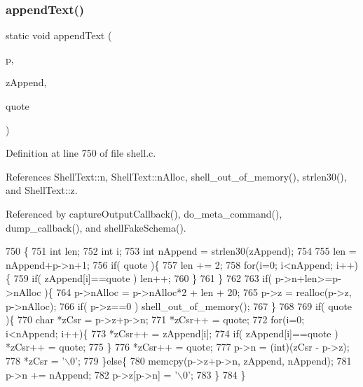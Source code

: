 \subsubsection{append\+Text()}
{\footnotesize\ttfamily static void append\+Text (\begin{DoxyParamCaption}\item[{\textbf{ Shell\+Text} $\ast$}]{p,  }\item[{char const $\ast$}]{z\+Append,  }\item[{char}]{quote }\end{DoxyParamCaption})\hspace{0.3cm}{\ttfamily [static]}}



Definition at line 750 of file shell.\+c.



References Shell\+Text\+::n, Shell\+Text\+::n\+Alloc, shell\+\_\+out\+\_\+of\+\_\+memory(), strlen30(), and Shell\+Text\+::z.



Referenced by capture\+Output\+Callback(), do\+\_\+meta\+\_\+command(), dump\+\_\+callback(), and shell\+Fake\+Schema().


\begin{DoxyCode}
750                                                                      \{
751   \textcolor{keywordtype}{int} len;
752   \textcolor{keywordtype}{int} i;
753   \textcolor{keywordtype}{int} nAppend = strlen30(zAppend);
754 
755   len = nAppend+p->n+1;
756   \textcolor{keywordflow}{if}( quote )\{
757     len += 2;
758     \textcolor{keywordflow}{for}(i=0; i<nAppend; i++)\{
759       \textcolor{keywordflow}{if}( zAppend[i]==quote ) len++;
760     \}
761   \}
762 
763   \textcolor{keywordflow}{if}( p->n+len>=p->nAlloc )\{
764     p->nAlloc = p->nAlloc*2 + len + 20;
765     p->z = realloc(p->z, p->nAlloc);
766     \textcolor{keywordflow}{if}( p->z==0 ) shell_out_of_memory();
767   \}
768 
769   \textcolor{keywordflow}{if}( quote )\{
770     \textcolor{keywordtype}{char} *zCsr = p->z+p->n;
771     *zCsr++ = quote;
772     \textcolor{keywordflow}{for}(i=0; i<nAppend; i++)\{
773       *zCsr++ = zAppend[i];
774       \textcolor{keywordflow}{if}( zAppend[i]==quote ) *zCsr++ = quote;
775     \}
776     *zCsr++ = quote;
777     p->n = (int)(zCsr - p->z);
778     *zCsr = \textcolor{charliteral}{'\(\backslash\)0'};
779   \}\textcolor{keywordflow}{else}\{
780     memcpy(p->z+p->n, zAppend, nAppend);
781     p->n += nAppend;
782     p->z[p->n] = \textcolor{charliteral}{'\(\backslash\)0'};
783   \}
784 \}
\end{DoxyCode}
\mbox{\label{shell_8c_a6ba93580d406f8a3de0be001531a0ed1}} 
